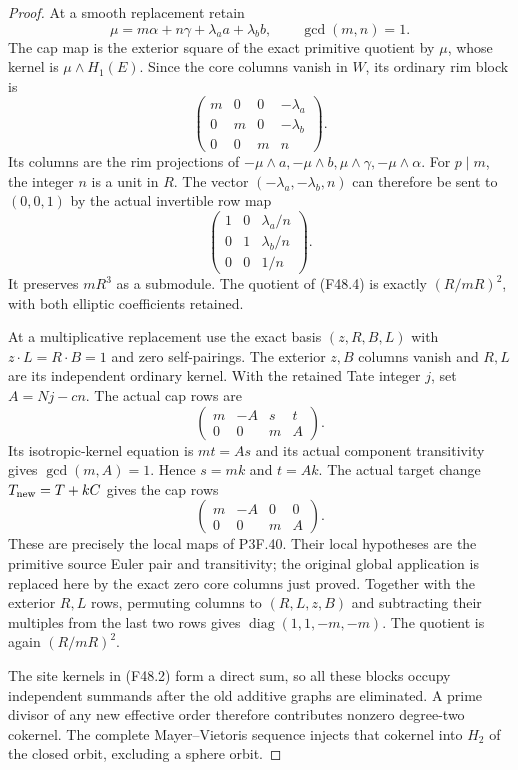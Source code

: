\begin{proof}
At a smooth replacement retain
\[
 \mu=m\alpha+n\gamma+\lambda_a a+\lambda_b b,
                    \qquad\gcd(m,n)=1.
\]
The cap map is the exterior square of the exact primitive
quotient by $\mu$, whose kernel is $\mu\wedge H_1(E)$.
Since the core columns vanish in $W$, its ordinary rim block is
\[
 \begin{pmatrix}
 m&0&0&-\lambda_a\\0&m&0&-\lambda_b\\0&0&m&n
 \end{pmatrix}.                                                   \tag{F48.4}
\]
Its columns are the rim projections of
$-\mu\wedge a,-\mu\wedge b,\mu\wedge\gamma,-\mu\wedge\alpha$.
For $p\mid m$, the integer $n$ is a unit in $R$.
The vector $(-\lambda_a,-\lambda_b,n)$ can therefore be
sent to $(0,0,1)$ by the actual invertible row map
\[
 \begin{pmatrix}1&0&\lambda_a/n\\0&1&\lambda_b/n\\0&0&1/n\end{pmatrix}.
\]
It preserves $mR^3$ as a submodule. The quotient of (F48.4)
is exactly $(R/mR)^2$, with both elliptic coefficients retained.

At a multiplicative replacement use the exact basis
$(z,R,B,L)$ with $z\cdot L=R\cdot B=1$ and zero
self-pairings. The exterior $z,B$ columns vanish and $R,L$
are its independent ordinary kernel. With the retained Tate
integer $j$, set $A=Nj-cn$. The actual cap rows are
\[
                 \begin{pmatrix}m&-A&s&t\\0&0&m&A\end{pmatrix}.
\]
Its isotropic-kernel equation is $mt=As$ and its actual
component transitivity gives $\gcd(m,A)=1$. Hence $s=mk$
and $t=Ak$. The actual target change $T_{\rm new}=T+kC$
gives the cap rows
\[
                 \begin{pmatrix}m&-A&0&0\\0&0&m&A\end{pmatrix}. \tag{F48.5}
\]
These are precisely the local maps of P3F.40. Their local
hypotheses are the primitive source Euler pair and
transitivity; the original global application is replaced
here by the exact zero core columns just proved.
Together with the exterior $R,L$ rows, permuting columns
to $(R,L,z,B)$ and subtracting their multiples from the last
two rows gives
$\operatorname{diag}(1,1,-m,-m)$.
The quotient is again $(R/mR)^2$.

The site kernels in (F48.2) form a direct sum, so all these
blocks occupy independent summands after the old additive
graphs are eliminated. A prime divisor of any new effective
order therefore contributes nonzero degree-two cokernel.
The complete Mayer--Vietoris sequence injects that cokernel
into $H_2$ of the closed orbit, excluding a sphere orbit.


\end{proof}
